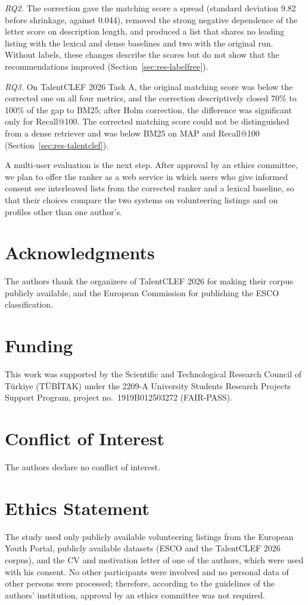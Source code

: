 \documentclass[CHICAGO]{USG}
\begin{document}
\emph{RQ2.} The correction gave the matching score a spread (standard deviation 9.82 before shrinkage, against 0.044), removed the strong negative dependence of the letter score on description length, and produced a list that shares no leading listing with the lexical and dense baselines and two with the original run. Without labels, these changes describe the scores but do not show that the recommendations improved (Section~\ref{sec:res-labelfree}). %

\emph{RQ3.} On TalentCLEF 2026 Task A, the original matching score was below the corrected one on all four metrics, and the correction descriptively closed 70\% to 100\% of the gap to BM25; after Holm correction, the difference was significant only for Recall@100. The corrected matching score could not be distinguished from a dense retriever and was below BM25 on MAP and Recall@100 (Section~\ref{sec:res-talentclef}). %

A multi-user evaluation is the next step. After approval by an ethics committee, we plan to offer the ranker as a web service in which users who give informed consent see interleaved lists from the corrected ranker and a lexical baseline, so that their choices compare the two systems on volunteering listings and on profiles other than one author's.

\section*{Acknowledgments}
The authors thank the organizers of TalentCLEF 2026 for making their corpus publicly available, and the European Commission for publishing the ESCO classification.

\section*{Funding}
This work was supported by the Scientific and Technological Research Council of T\"urkiye (T\"UB\.{I}TAK) under the 2209-A University Students Research Projects Support Program, project no.\ 1919B012503272 (FAIR-PASS).

\section*{Conflict of Interest}
The authors declare no conflict of interest.

\section*{Ethics Statement}
The study used only publicly available volunteering listings from the European Youth Portal, publicly available datasets (ESCO and the TalentCLEF 2026 corpus), and the CV and motivation letter of one of the authors, which were used with his consent. No other participants were involved and no personal data of other persons were processed; therefore, according to the guidelines of the authors' institution, approval by an ethics committee was not required.
\end{document}
